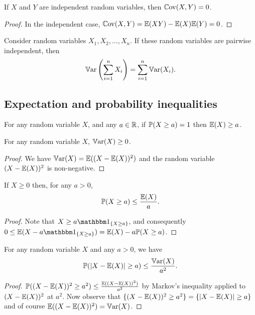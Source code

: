 \documentclass[10pt, a4paper]{article}
\begin{document}
\begin{corollary}
    If $X$ and $Y$ are independent random variables,
    then $\Cov(X, Y) = 0$.
    \begin{proof}
        In the independent case,
        $\Cov(X, Y) = \E(XY) - \E(X)\E(Y) = 0$.
    \end{proof}
\end{corollary}

\begin{corollary}
    Consider random variables $X_1, X_2, \dotsc, X_n$.
    If these random variables are pairwise independent,
    then
    \[
    \Var\left(\sum_{i = 1}^{n}X_i\right) = \sum_{i = 1}^{n}\Var(X_i).
    \]
\end{corollary}

\subsection{Expectation and probability inequalities}
\begin{theorem}
    For any random variable $X$,
    and any $a \in \R$,
    if $\P(X \geq a) = 1$ then $\E(X) \geq a$.
\end{theorem}

\begin{corollary}
    For any random variable $X$,
    $\Var(X) \geq 0$.
    \begin{proof}
        We have $\Var(X) = \E((X - \E(X)) ^ 2)$ and the random variable $(X - \E(X)) ^ 2$ is non-negative.
    \end{proof}
\end{corollary}

\begin{corollary}
    If $X \geq 0$ then,
    for any $a > 0$,
    \[
    \P(X \geq a) \leq \frac{\E(X)}{a}.
    \]
    \begin{proof}
        Note that $X \geq a\ind[\{X \geq a\}]$,
        and consequently $0 \leq \E(X - a\ind[\{X \geq a\}]) = \E(X) - a\P(X \geq a)$.
    \end{proof}
\end{corollary}

\begin{corollary}
    For any random variable $X$ and any $a > 0$,
    we have
    \[
    \P(|X - \E(X)| \geq a) \leq \frac{\Var(X)}{a ^ 2}.
    \]
    \begin{proof}
        $\P((X - \E(X)) ^ 2 \geq a ^ 2) \leq \frac{\E((X - \E(X)) ^ 2)}{a ^ 2}$ by Markov's inequality applied to $(X - \E(X)) ^ 2$ at $a ^ 2$.
        Now observe that $\{(X - \E(X)) ^ 2 \geq a ^ 2\} = \{|X - \E(X)| \geq a\}$ and of course $\E((X - \E(X)) ^ 2) = \Var(X)$.
    \end{proof}
\end{corollary}
\end{document}
